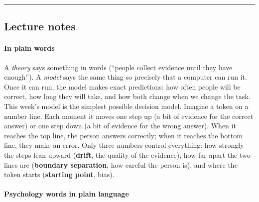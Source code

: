 \begin{center}\rule{0.5\linewidth}{0.5pt}\end{center}


\subsection{Lecture notes}

\paragraph{In plain words}

A \emph{theory} says something in words (``people collect evidence until
they have enough''). A \emph{model} says the same thing so precisely
that a computer can run it. Once it can run, the model makes exact
predictions: how often people will be correct, how long they will take,
and how both change when we change the task. This week's model is the
simplest possible decision model. Imagine a token on a number line. Each
moment it moves one step up (a bit of evidence for the correct answer)
or one step down (a bit of evidence for the wrong answer). When it
reaches the top line, the person answers correctly; when it reaches the
bottom line, they make an error. Only three numbers control everything:
how strongly the steps lean upward (\textbf{drift}, the quality of the
evidence), how far apart the two lines are (\textbf{boundary
separation}, how careful the person is), and where the token starts
(\textbf{starting point}, bias).

\paragraph{Psychology words in plain language}

